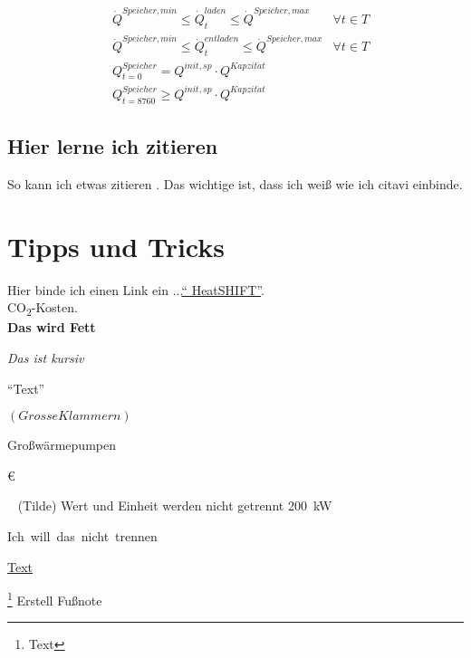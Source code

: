 \begin{align}
	&\dot{Q}^{Speicher,min} \leq \dot{Q}^{laden}_{t} \leq \dot{Q}^{Speicher,max}&\forall t \in T \label{eq:opt_grenze_beladen_speicher}\\
	&\dot{Q}^{Speicher,min} \leq \dot{Q}^{entladen}_{t} \leq \dot{Q}^{Speicher,max} &\forall t \in T \label{eq:opt_grenze_entladen_speicher}\\
	&Q^{Speicher}_{t=0} = Q^{init, sp} \cdot Q^{Kapzit \ddot{a} t}& \label{eq:opt_start_speicher}\\
	&Q^{Speicher}_{t=8760} \geq Q^{init, sp} \cdot Q^{Kapzit \ddot{a} t} & \label{eq:opt_end_speicher}
\end{align}


\section{Hier lerne ich zitieren}
	\label{sec:zitieren}
	
So kann ich etwas zitieren \cite{openai2024chatgpt}. Das wichtige ist, dass ich weiß wie ich citavi einbinde.
	
	
\chapter{Tipps und Tricks}
	\label{chap:tipps}
	
Hier binde ich einen Link ein ...\href{https://forschung.hs-kempten.de/de/forschungsprojekt/482-heatshift}{\enquote{ HeatSHIFT}}.\\
CO\textsubscript{2}-Kosten. \\
\textbf{Das wird Fett}

\textit{Das ist kursiv}

\enquote{Text}

$\left( Grosse Klammern\right)$

Groß\-wärme\-pumpen

\euro

\pagebreak

~ (Tilde)
Wert und Einheit werden nicht getrennt 200~kW
%

\mbox{Ich will das nicht trennen}

\href{link}{Text}

\footnote{Text}
Erstell Fußnote

